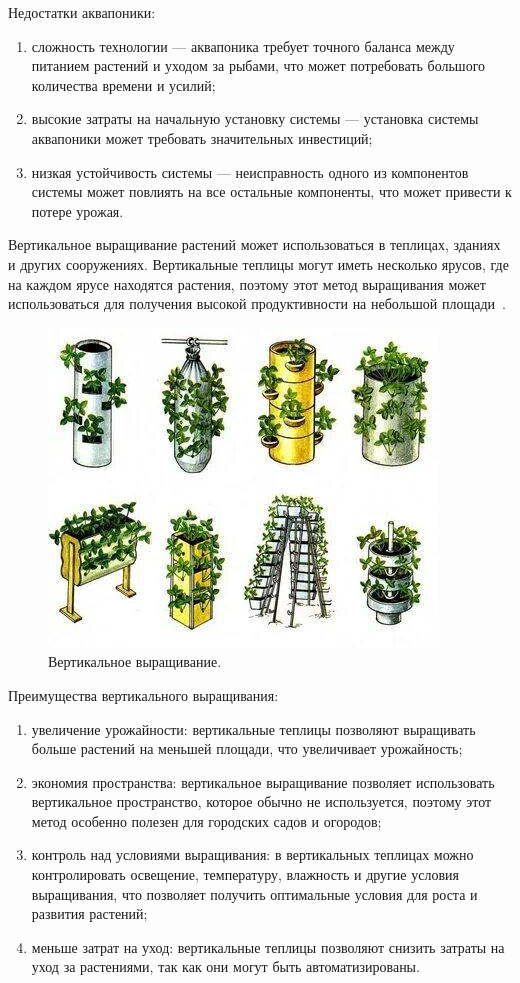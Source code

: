 Недостатки аквапоники:

\begin{enumerate}
    \item сложность технологии --- аквапоника требует точного баланса между питанием растений и уходом за рыбами, что может потребовать большого количества времени и усилий;
    \item высокие затраты на начальную установку системы --- установка системы аквапоники может требовать значительных инвестиций;
    \item низкая устойчивость системы --- неисправность одного из компонентов системы может повлиять на все остальные компоненты, что может привести к потере урожая.
\end{enumerate}

Вертикальное выращивание растений может использоваться в теплицах, зданиях и других сооружениях. Вертикальные теплицы могут иметь несколько ярусов, где на каждом ярусе находятся растения, поэтому этот метод выращивания может использоваться для получения высокой продуктивности на небольшой площади~\cite{Vertical}.

\begin{figure}[H]
    \centering
    \includegraphics{images/vertical_growing.jpg}
    \caption{Вертикальное выращивание.}
    \label{fig:vertical_growing}
\end{figure}

Преимущества вертикального выращивания:

\begin{enumerate}
    \item увеличение урожайности: вертикальные теплицы позволяют выращивать больше растений на меньшей площади, что увеличивает урожайность;
    \item экономия пространства: вертикальное выращивание позволяет использовать вертикальное пространство, которое обычно не используется, поэтому этот метод особенно полезен для городских садов и огородов;
    \item контроль над условиями выращивания: в вертикальных теплицах можно контролировать освещение, температуру, влажность и другие условия выращивания, что позволяет получить оптимальные условия для роста и развития растений;
    \item меньше затрат на уход: вертикальные теплицы позволяют снизить затраты на уход за растениями, так как они могут быть автоматизированы.
\end{enumerate}

